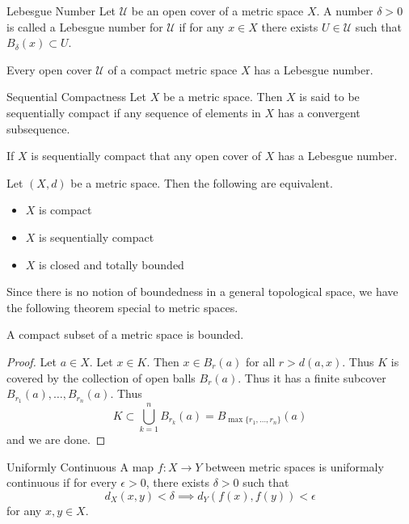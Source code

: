 \documentclass[a4paper]{article}
\begin{document}
\begin{defn}{Lebesgue Number}{} Let $\mathcal{U}$ be an open cover of a metric space $X$. A number $\delta>0$ is called a Lebesgue number for $\mathcal{U}$ if for any $x\in X$ there exists $U\in\mathcal{U}$ such that $B_\delta(x)\subset U$. 
\end{defn}

\begin{lmm}{}{} Every open cover $\mathcal{U}$ of a compact metric space $X$ has a Lebesgue number. 
\end{lmm}

\begin{defn}{Sequential Compactness}{} Let $X$ be a metric space. Then $X$ is said to be sequentially compact if any sequence of elements in $X$ has a convergent subsequence. 
\end{defn}

\begin{lmm}{}{} If $X$ is sequentially compact that any open cover of $X$ has a Lebesgue number. 
\end{lmm}

\begin{prp}{}{} Let $(X,d)$ be a metric space. Then the following are equivalent. 
\begin{itemize}
\item $X$ is compact
\item $X$ is sequentially compact
\item $X$ is closed and totally bounded
\end{itemize}
\end{prp}

Since there is no notion of boundedness in a general topological space, we have the following theorem special to metric spaces. 

\begin{prp}{}{} A compact subset of a metric space is bounded. \tcbline
\begin{proof}
Let $a\in X$. Let $x\in K$. Then $x\in B_r(a)$ for all $r>d(a,x)$. Thus $K$ is covered by the collection of open balls $B_r(a)$. Thus it has a finite subcover $B_{r_1}(a),\dots,B_{r_n}(a)$. Thus $$K\subset\bigcup_{k=1}^nB_{r_k}(a)=B_{\max\{r_1,\dots,r_n\}}(a)$$ and we are done. 
\end{proof}
\end{prp}

\begin{defn}{Uniformly Continuous}{} A map $f:X\to Y$ between metric spaces is uniformaly continuous if for every $\epsilon>0$, there exists $\delta>0$ such that $$d_X(x,y)<\delta\implies d_Y(f(x),f(y))<\epsilon$$ for any $x,y\in X$. 
\end{defn}
\end{document}
